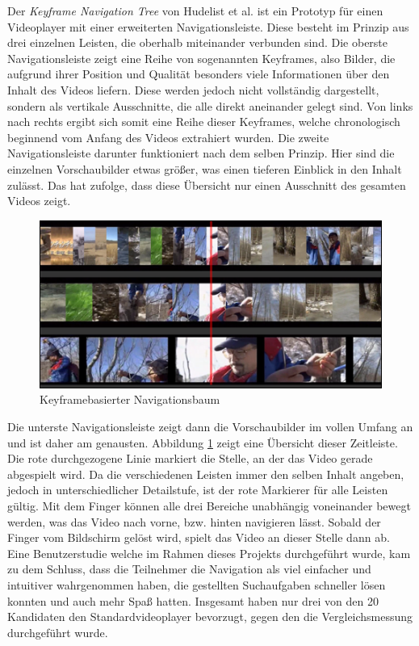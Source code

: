 \documentclass[11pt,a4paper]{report}
\begin{document}
Der \emph{Keyframe Navigation Tree} von Hudelist et al. \cite{hudelist2015improving} ist ein Prototyp für einen Videoplayer mit einer erweiterten Navigationsleiste. Diese besteht im Prinzip aus drei einzelnen Leisten, die oberhalb miteinander verbunden sind. Die oberste Navigationsleiste zeigt eine Reihe von sogenannten Keyframes, also Bilder, die aufgrund ihrer Position und Qualität besonders viele Informationen über den Inhalt des Videos liefern. Diese werden jedoch nicht vollständig dargestellt, sondern als vertikale Ausschnitte, die alle direkt aneinander gelegt sind. Von links nach rechts ergibt sich somit eine Reihe dieser Keyframes, welche chronologisch beginnend vom Anfang des Videos extrahiert wurden. Die zweite Navigationsleiste darunter funktioniert nach dem selben Prinzip. Hier sind die einzelnen Vorschaubilder etwas größer, was einen tieferen Einblick in den Inhalt zulässt. Das hat zufolge, dass diese Übersicht nur einen Ausschnitt des gesamten Videos zeigt.
\begin{figure}[h]
\begin{center}
\includegraphics[scale=0.9]{./images/12.png}
\caption{Keyframebasierter Navigationsbaum \cite{hudelist2015improving}}
\label{keyframe_tree}
\end{center}
\end{figure}
Die unterste Navigationsleiste zeigt dann die Vorschaubilder im vollen Umfang an und ist daher am genausten. Abbildung \ref{keyframe_tree} zeigt eine Übersicht dieser Zeitleiste. Die rote durchgezogene Linie markiert die Stelle, an der das Video gerade abgespielt wird. Da die verschiedenen Leisten immer den selben Inhalt angeben, jedoch in unterschiedlicher Detailstufe, ist der rote Markierer für alle Leisten gültig. Mit dem Finger können alle drei Bereiche unabhängig voneinander bewegt werden, was das Video nach vorne, bzw. hinten navigieren lässt. Sobald der Finger vom Bildschirm gelöst wird, spielt das Video an dieser Stelle dann ab. Eine Benutzerstudie welche im Rahmen dieses Projekts durchgeführt wurde, kam zu dem Schluss, dass die Teilnehmer die Navigation als viel einfacher und intuitiver wahrgenommen haben, die gestellten Suchaufgaben schneller lösen konnten und auch mehr Spaß hatten. Insgesamt haben nur drei von den 20 Kandidaten den Standardvideoplayer bevorzugt, gegen den die Vergleichsmessung durchgeführt wurde.
\end{document}
